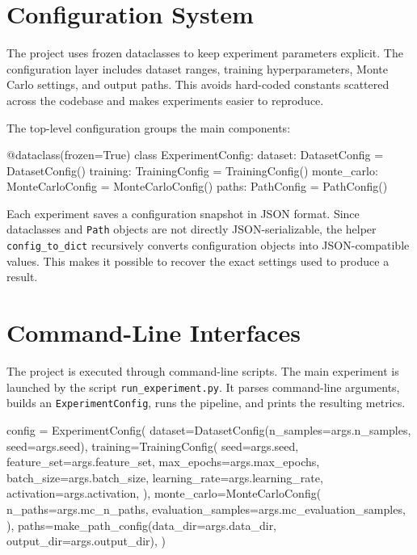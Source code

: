 \section{Configuration System}

The project uses frozen dataclasses to keep experiment parameters explicit.
The configuration layer includes dataset ranges, training hyperparameters, Monte Carlo settings, and output paths.
This avoids hard-coded constants scattered across the codebase and makes experiments easier to reproduce.

The top-level configuration groups the main components:

\begin{projectlistingbox}
@dataclass(frozen=True)
class ExperimentConfig:
    dataset: DatasetConfig = DatasetConfig()
    training: TrainingConfig = TrainingConfig()
    monte_carlo: MonteCarloConfig = MonteCarloConfig()
    paths: PathConfig = PathConfig()
\end{projectlistingbox}

Each experiment saves a configuration snapshot in JSON format.
Since dataclasses and \texttt{Path} objects are not directly JSON-serializable, the helper \texttt{config\_to\_dict} recursively converts configuration objects into JSON-compatible values.
This makes it possible to recover the exact settings used to produce a result.

\section{Command-Line Interfaces}

The project is executed through command-line scripts.
The main experiment is launched by the script \texttt{run\_experiment.py}.
It parses command-line arguments, builds an \texttt{ExperimentConfig}, runs the pipeline, and prints the resulting metrics.

\begin{projectlistingbox}
config = ExperimentConfig(
    dataset=DatasetConfig(n_samples=args.n_samples, seed=args.seed),
    training=TrainingConfig(
        seed=args.seed,
        feature_set=args.feature_set,
        max_epochs=args.max_epochs,
        batch_size=args.batch_size,
        learning_rate=args.learning_rate,
        activation=args.activation,
    ),
    monte_carlo=MonteCarloConfig(
        n_paths=args.mc_n_paths,
        evaluation_samples=args.mc_evaluation_samples,
    ),
    paths=make_path_config(data_dir=args.data_dir, output_dir=args.output_dir),
)
\end{projectlistingbox}

